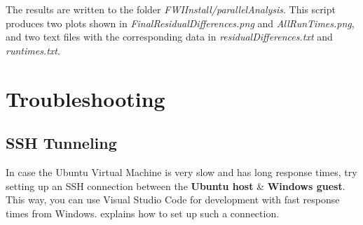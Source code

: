 \documentclass[10pt]{article}
\begin{document}
The results are written to the folder \textit{FWIInstall/parallelAnalysis}. This script produces two plots shown in \textit{FinalResidualDifferences.png} and \textit{AllRunTimes.png}, and two text files with the corresponding data in \textit{residualDifferences.txt} and \textit{runtimes.txt}.


\section{Troubleshooting}
\subsection{SSH Tunneling}
In case the Ubuntu Virtual Machine is very slow and has long response times, try setting up an SSH connection between the \textbf{Ubuntu host} \& \textbf{Windows guest}. This way, you can use Visual Studio Code for development with fast response times from Windows. \href{https://stackoverflow.com/questions/5906441/how-to-ssh-to-a-virtualbox-guest-externally-through-a-host}{\color{blue}{This post}} explains how to set up such a connection.
\end{document}
